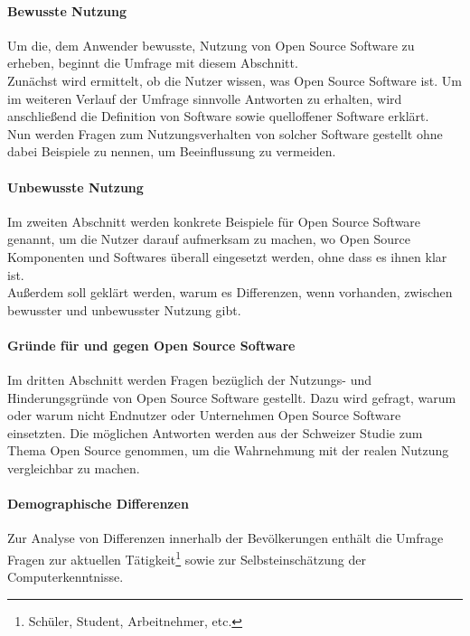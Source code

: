 \documentclass[a4paper]{article}
\begin{document}
    			\paragraph{Bewusste Nutzung}
    				Um die, dem Anwender bewusste, Nutzung von Open Source Software zu erheben, beginnt die Umfrage mit diesem Abschnitt.\\
    				Zunächst wird ermittelt, ob die Nutzer wissen, was Open Source Software ist. Um im weiteren Verlauf der Umfrage sinnvolle Antworten zu erhalten, wird anschließend die Definition von Software sowie quelloffener Software erklärt.\\
    				Nun werden Fragen zum Nutzungsverhalten von solcher Software gestellt ohne dabei Beispiele zu nennen, um Beeinflussung zu vermeiden.
    			
    			\paragraph{Unbewusste Nutzung}
    				Im zweiten Abschnitt werden konkrete Beispiele für Open Source Software genannt, um die Nutzer darauf aufmerksam zu machen, wo Open Source Komponenten und Softwares überall eingesetzt werden, ohne dass es ihnen klar ist.\\
    				Außerdem soll geklärt werden, warum es Differenzen, wenn vorhanden, zwischen bewusster und unbewusster Nutzung gibt.
    			
    			\paragraph{Gründe für und gegen Open Source Software}
    				Im dritten Abschnitt werden Fragen bezüglich der Nutzungs- und Hinderungsgründe von Open Source Software gestellt. Dazu wird gefragt, warum oder warum nicht Endnutzer oder Unternehmen Open Source Software einsetzten. Die möglichen Antworten werden aus der Schweizer Studie zum Thema Open Source\cite{oss:studie} genommen, um die Wahrnehmung mit der realen Nutzung vergleichbar zu machen.
    			
    			\paragraph{Demographische Differenzen}
    				Zur Analyse von Differenzen innerhalb der Bevölkerungen enthält die Umfrage Fragen zur aktuellen Tätigkeit\footnote{Schüler, Student, Arbeitnehmer, etc.} sowie zur Selbsteinschätzung der Computerkenntnisse.
				
\end{document}
